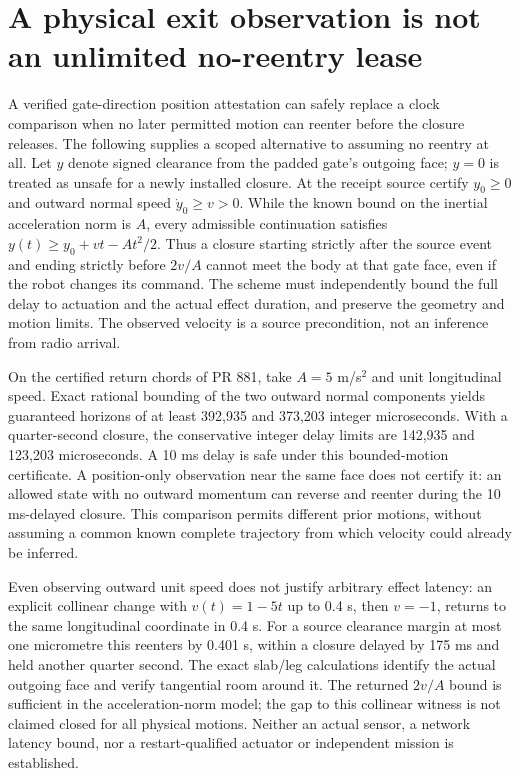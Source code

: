 \documentclass{article}
\begin{document}
\section*{A physical exit observation is not an unlimited no-reentry lease}
A verified gate-direction position attestation can safely replace a
clock comparison when no later permitted motion can reenter before
the closure releases. The following supplies a scoped alternative to
assuming no reentry at all. Let $y$ denote signed clearance from the
padded gate's outgoing face; $y=0$ is treated as unsafe for a newly
installed closure. At the receipt source certify $y_0\ge0$ and
outward normal speed $\dot y_0\ge v>0$. While the known bound on the
inertial acceleration norm is $A$, every admissible continuation
satisfies $y(t)\ge y_0+vt-At^2/2$. Thus a closure starting strictly
after the source event and ending strictly before $2v/A$ cannot meet
the body at that gate face, even if the robot changes its command.
The scheme must independently bound the full delay to actuation and
the actual effect duration, and preserve the geometry and motion
limits. The observed velocity is a source precondition, not an
inference from radio arrival.

On the certified return chords of PR 881, take $A=5$ m/s$^2$ and
unit longitudinal speed. Exact rational bounding of the two outward
normal components yields guaranteed horizons of at least
392,935 and 373,203 integer microseconds. With a quarter-second closure,
the conservative integer delay limits are 142,935 and 123,203
microseconds. A 10 ms delay is safe under this bounded-motion
certificate. A position-only observation near the same face does not
certify it: an allowed state with no outward momentum can reverse
and reenter during the 10 ms-delayed closure. This comparison permits
different prior motions, without assuming a common known complete
trajectory from which velocity could already be inferred.

Even observing outward unit speed does not justify arbitrary effect
latency: an explicit collinear change with $v(t)=1-5t$ up to 0.4 s,
then $v=-1$, returns to the same longitudinal coordinate in 0.4 s.
For a source clearance margin at most one micrometre this reenters
by 0.401 s, within a closure delayed by 175 ms and held another
quarter second. The exact slab/leg calculations identify the actual
outgoing face and verify tangential room around it. The returned
$2v/A$ bound is sufficient in the acceleration-norm model; the
gap to this collinear witness is not claimed closed for all physical
motions. Neither an actual sensor, a network latency bound, nor a
restart-qualified actuator or independent mission is established.
\end{document}
